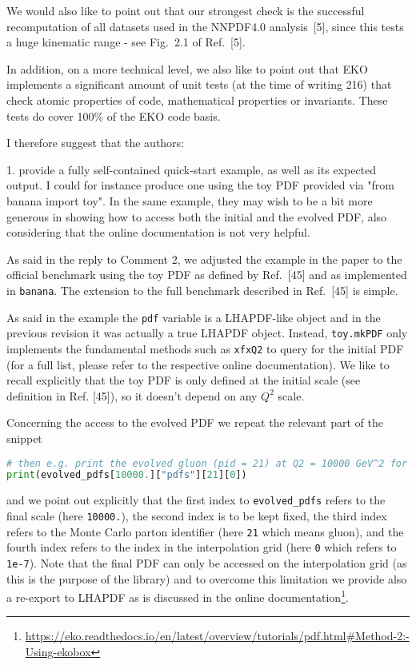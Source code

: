 \documentclass[a4paper,11pt]{article}
\begin{document}
\begin{response}
We would also like to point out that our strongest check is the successful recomputation of all datasets used in the NNPDF4.0
analysis~[5], since this tests a huge kinematic range - see Fig.~2.1 of Ref.~[5].

In addition, on a more technical level, we also like to point out that EKO implements a significant amount of unit tests
(at the time of writing 216) that check atomic properties of code, mathematical properties or invariants. These tests do cover
100\% of the EKO code basis.
\end{response}

\begin{response}{
  I therefore suggest that the authors:
  
  1. provide a fully self-contained quick-start example, as well as its expected
  output. I could for instance produce one using the toy PDF provided via "from
  banana import toy". In the same example, they may wish to be a bit more generous
  in showing how to access both the initial and the evolved PDF, also considering
  that the online documentation is not very helpful.
}
As said in the reply to Comment 2, we adjusted the example in the paper to the official benchmark
using the toy PDF as defined by Ref.~[45] and as implemented in \texttt{banana}.
The extension to the full benchmark described in Ref.~[45] is simple.

As said in the example the \texttt{pdf} variable is a LHAPDF-like object and in the previous revision
it was actually a true LHAPDF object. Instead, \texttt{toy.mkPDF} only implements the fundamental methods
such as \texttt{xfxQ2} to query for the initial PDF (for a full list, please refer to the respective online documentation).
We like to recall explicitly that the toy PDF is only defined at the initial scale (see definition in Ref. [45]),
so it doesn't depend on any $Q^2$ scale.

Concerning the access to the evolved PDF we repeat the relevant part of the snippet
\begin{lstlisting}[language=Python]
# then e.g. print the evolved gluon (pid = 21) at Q2 = 10000 GeV^2 for the first point x=1e-7
print(evolved_pdfs[10000.]["pdfs"][21][0])
\end{lstlisting}
and we point out explicitly that the first index to \texttt{evolved\_pdfs} refers to the final scale (here \texttt{10000.}),
the second index is to be kept fixed,
the third index refers to the Monte Carlo parton identifier (here \texttt{21} which means gluon), and the fourth index refers to the index
in the interpolation grid (here \texttt{0} which refers to \texttt{1e-7}).
Note that the final PDF can only be accessed on the interpolation grid (as this is the purpose of the library) and to overcome
this limitation we provide also a re-export to LHAPDF as is discussed in the online documentation\footnote{\url{https://eko.readthedocs.io/en/latest/overview/tutorials/pdf.html\#Method-2:-Using-ekobox}}.
\end{response}
\end{document}
